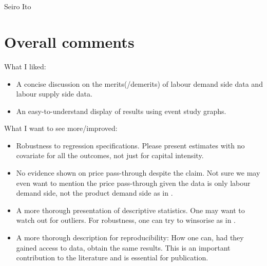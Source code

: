 \hfil\MonthDY\\
\hfil{\footnotesize\currenttime}\\

\hfil Seiro Ito


\setlength{\parindent}{1em}
\vspace{2ex}

\section{Overall comments}

What I liked:
\begin{itemize}
\vspace{1.0ex}\setlength{\itemsep}{1.0ex}\setlength{\baselineskip}{12pt}
\item	A concise discussion on the merits(/demerits) of labour demand side data and labour supply side data.
\item	An easy-to-understand display of results using event study graphs.
\end{itemize}

\vspace{1ex}
What I want to see more/improved:
\begin{itemize}
\vspace{1.0ex}\setlength{\itemsep}{1.0ex}\setlength{\baselineskip}{12pt}
\item	Robustness to regression specifications. Please present estimates with no covariate for all the outcomes, not just for capital intensity.
\item	No evidence shown on price pass-through despite the claim. Not sure we may even want to mention the price pass-through given the data is only labour demand side, not the product demand side as in \citet{HarasztosiLindner2019}.
\item	A more thorough presentation of descriptive statistics. One may want to watch out for outliers.  For robustness, one can try to winsorise as in \citet{HarasztosiLindner2019}.
\item	A more thorough description for reproducibility: How one can, had they gained access to data, obtain the same results. This is an important contribution to the literature and is essential for publication.
\end{itemize}

